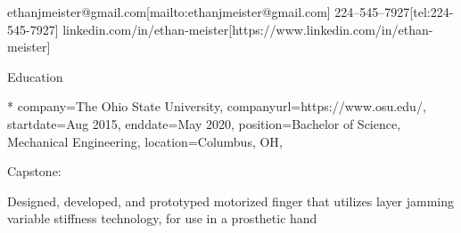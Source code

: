 \documentclass[10pt]{article}
\begin{document}
    {ethanjmeister@gmail.com}[mailto:ethanjmeister@gmail.com]
    {224--545--7927}[tel:224-545-7927]
    {linkedin.com/in/ethan-meister}[https://www.linkedin.com/in/ethan-meister]

\vspace{-0.1cm}

\begin{resume_sec}
    {Education}

    \begin{subsec}*
        {
            company={The Ohio State University},
            companyurl={https://www.osu.edu/},
            startdate={Aug 2015},
            enddate={May 2020},
            position={Bachelor of Science, Mechanical Engineering},
            location={Columbus, OH},
        }
        \begin{addmargin}[0pt]{0pt}
                \begin{minipage}[t]{5em}
                    Capstone:
                \end{minipage}\begin{minipage}[t]{48em}
                    \textcolor{UI_gray}{\fontsize{9.5pt}{12pt}\selectfont%
                        Designed, developed, and prototyped motorized finger that utilizes layer jamming variable stiffness \newline technology, for use in a prosthetic hand
                    }
                \end{minipage}
                
        \end{addmargin}
    \end{subsec}
    \vspace{-2pt}
\end{resume_sec}
\end{document}
